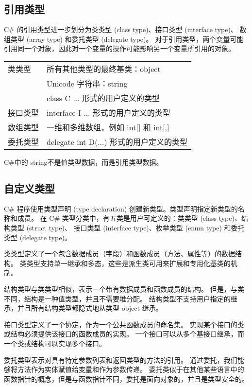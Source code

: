 \subsection{引用类型}
C\# 的引用类型进一步划分为类类型 (class type)、接口类型 (interface type)、
数组类型 (array type) 和委托类型 (delegate type)。
对于引用类型，两个变量可能引用同一个对象，因此对一个变量的操作可能影响另一个变量所引用的对象。

\begin{tabular}{|l|l|}
\hline
类类型  &  所有其他类型的最终基类：object \\
              &  Unicode 字符串：string \\
              &  class C {...} 形式的用户定义的类型 \\
\hline
接口类型  & interface I {...} 形式的用户定义的类型  \\
数组类型  & 一维和多维数组，例如 int[] 和 int[,]  \\
委托类型  & delegate int D(...) 形式的用户定义的类型  \\
\hline
\end{tabular}

C\#中的 string不是值类型数据，而是引用类型数据。

\subsection{自定义类型}
C\# 程序使用类型声明 (type declaration) 创建新类型。类型声明指定新类型的名称和成员。
在 C\# 类型分类中，有五类是用户可定义的：类类型 (class type)、结构类型 (struct type)、
接口类型 (interface type)、枚举类型 (enum type) 和委托类型 (delegate type)。


类类型定义了一个包含数据成员（字段）和函数成员（方法、属性等）的数据结构。
类类型支持单一继承和多态，这些是派生类可用来扩展和专用化基类的机制。

结构类型与类类型相似，表示一个带有数据成员和函数成员的结构。
但是，与类不同，结构是一种值类型，并且不需要堆分配。
结构类型不支持用户指定的继承，并且所有结构类型都隐式地从类型 object 继承。

接口类型定义了一个协定，作为一个公共函数成员的命名集。
实现某个接口的类或结构必须提供该接口的函数成员的实现。
一个接口可以从多个基接口继承，而一个类或结构可以实现多个接口。

委托类型表示对具有特定参数列表和返回类型的方法的引用。
通过委托，我们能够将方法作为实体赋值给变量和作为参数传递。
委托类似于在其他某些语言中的函数指针的概念，但是与函数指针不同，委托是面向对象的，并且是类型安全的。

